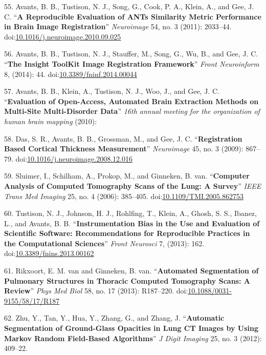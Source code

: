 \documentclass[11pt,]{article}
\begin{document}
\hypertarget{ref-Avants:2011ab}{}
55. Avants, B. B., Tustison, N. J., Song, G., Cook, P. A., Klein, A.,
and Gee, J. C. ``\textbf{A Reproducible Evaluation of ANTs Similarity
Metric Performance in Brain Image Registration}'' \emph{Neuroimage} 54,
no. 3 (2011): 2033--44.
doi:\href{https://doi.org/10.1016/j.neuroimage.2010.09.025}{10.1016/j.neuroimage.2010.09.025}

\hypertarget{ref-Avants:2014aa}{}
56. Avants, B. B., Tustison, N. J., Stauffer, M., Song, G., Wu, B., and
Gee, J. C. ``\textbf{The Insight ToolKit Image Registration Framework}''
\emph{Front Neuroinform} 8, (2014): 44.
doi:\href{https://doi.org/10.3389/fninf.2014.00044}{10.3389/fninf.2014.00044}

\hypertarget{ref-Avants:2010ab}{}
57. Avants, B. B., Klein, A., Tustison, N. J., Woo, J., and Gee, J. C.
``\textbf{Evaluation of Open-Access, Automated Brain Extraction Methods
on Multi-Site Multi-Disorder Data}'' \emph{16th annual meeting for the
organization of human brain mapping} (2010):

\hypertarget{ref-Das:2009aa}{}
58. Das, S. R., Avants, B. B., Grossman, M., and Gee, J. C.
``\textbf{Registration Based Cortical Thickness Measurement}''
\emph{Neuroimage} 45, no. 3 (2009): 867--79.
doi:\href{https://doi.org/10.1016/j.neuroimage.2008.12.016}{10.1016/j.neuroimage.2008.12.016}

\hypertarget{ref-Sluimer:2006aa}{}
59. Sluimer, I., Schilham, A., Prokop, M., and Ginneken, B. van.
``\textbf{Computer Analysis of Computed Tomography Scans of the Lung: A
Survey}'' \emph{IEEE Trans Med Imaging} 25, no. 4 (2006): 385--405.
doi:\href{https://doi.org/10.1109/TMI.2005.862753}{10.1109/TMI.2005.862753}

\hypertarget{ref-Tustison:2013aa}{}
60. Tustison, N. J., Johnson, H. J., Rohlfing, T., Klein, A., Ghosh, S.
S., Ibanez, L., and Avants, B. B. ``\textbf{Instrumentation Bias in the
Use and Evaluation of Scientific Software: Recommendations for
Reproducible Practices in the Computational Sciences}'' \emph{Front
Neurosci} 7, (2013): 162.
doi:\href{https://doi.org/10.3389/fnins.2013.00162}{10.3389/fnins.2013.00162}

\hypertarget{ref-Rikxoort:2013aa}{}
61. Rikxoort, E. M. van and Ginneken, B. van. ``\textbf{Automated
Segmentation of Pulmonary Structures in Thoracic Computed Tomography
Scans: A Review}'' \emph{Phys Med Biol} 58, no. 17 (2013): R187--220.
doi:\href{https://doi.org/10.1088/0031-9155/58/17/R187}{10.1088/0031-9155/58/17/R187}

\hypertarget{ref-zhu2012:aa}{}
62. Zhu, Y., Tan, Y., Hua, Y., Zhang, G., and Zhang, J.
``\textbf{Automatic Segmentation of Ground-Glass Opacities in Lung CT
Images by Using Markov Random Field-Based Algorithms}'' \emph{J Digit
Imaging} 25, no. 3 (2012): 409--22.
\end{document}
